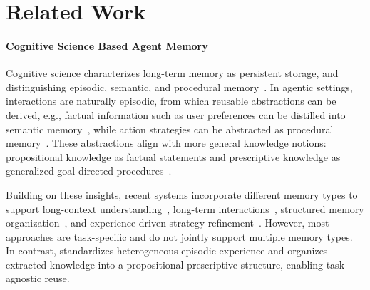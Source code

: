 \section{Related Work}

\paragraph{Cognitive Science Based Agent Memory}
Cognitive science characterizes long-term memory as persistent storage, and distinguishing episodic, semantic, and procedural memory~\citep{Atkinson1968HumanMemory,Tulving1972EpisodicSemantic,Squire2004MemorySystems}. In agentic settings, interactions are naturally episodic, from which reusable abstractions can be derived, e.g., factual information such as user preferences can be distilled into semantic memory~\citep{li2025memosmemoryosai}, while action strategies can be abstracted as procedural memory~\citep{wang2024agentworkflowmemory}. These abstractions align with more general knowledge notions: propositional knowledge as factual statements and prescriptive knowledge as generalized goal-directed procedures~\citep{10.1257/aer.103.3.545}.

Building on these insights, recent systems incorporate different memory types to support long-context understanding~\citep{lee2024humaninspiredreadingagentgist}, long-term interactions~\citep{li2025memosmemoryosai}, structured memory organization~\citep{anokhin2024arigraphlearningknowledgegraph,rasmussen2025zeptemporalknowledgegraph}, and experience-driven strategy refinement~\citep{zhao2024expelllmagentsexperiential,wang2024agentworkflowmemory,DBLP:journals/corr/abs-2508-06433}. However, most approaches are task-specific and do not jointly support multiple memory types. In contrast, \plugmem standardizes heterogeneous episodic experience and organizes extracted knowledge into a propositional-prescriptive structure, enabling task-agnostic reuse.

